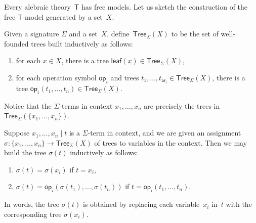 \documentclass{amsart}
\newcommand{\theory}[1]{\mathsf{#1}} %
\newcommand{\set}[1]{\{#1\}} %
\newcommand{\Tree}[2]{\mathsf{Tree}_{#1}(#2)} %
\newcommand{\leaf}[1]{\mathsf{leaf}(#1)} %
\newcommand{\op}[1]{\mathsf{op}_{#1}} %
\newcommand{\arity}[1]{\mathsf{ar}_{#1}} %
\begin{document}
Every alebraic theory~$\theory{T}$ has free models. Let us sketch the construction of the
free $\theory{T}$-model generated by a set~$X$.

Given a signature $\Sigma$ and a set~$X$, define~$\Tree{\Sigma}{X}$ to be the set of
well-founded trees built inductively as follows:
%
\begin{enumerate}
\item for each $x \in X$, there is a tree $\leaf{x} \in \Tree{\Sigma}{X}$,
\item for each operation symbol $\op{i}$ and trees
  $t_1, \ldots, t_{\arity{i}} \in \Tree{\Sigma}{X}$, there is a tree
  $\op{i}(t_1, \ldots, t_n) \in \Tree{\Sigma}{X}$.
\end{enumerate}
%
Notice that the $\Sigma$-terms in context $x_1, \ldots, x_n$ are precisely the trees
in $\Tree{\Sigma}{\set{x_1, \ldots, x_n}}$.

Suppose $x_1, \ldots, x_n \mid t$ is a $\Sigma$-term in context, and we are given an
assignment $\sigma : \set{x_1, \ldots, x_n} \to \Tree{\Sigma}{X}$ of trees to
variables in the context. Then we may build the tree $\sigma(t)$ inductively as follows:
%
\begin{enumerate}
\item $\sigma(t) = \sigma(x_i)$ if $t = x_i$,
\item $\sigma(t) = \op{i}(\sigma(t_1), \ldots, \sigma(t_n))$ if
  $t = \op{i}(t_1, \ldots, t_n)$.
\end{enumerate}
%
In words, the tree $\sigma(t)$ is obtained by replacing each variable~$x_i$ in~$t$ with
the corresponding tree $\sigma(x_i)$.
\end{document}
